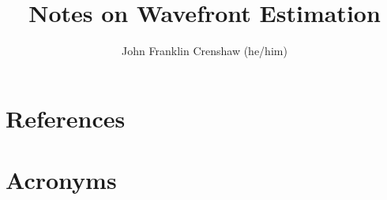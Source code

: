 \documentclass[SE,authoryear,toc]{lsstdoc}
\title{Notes on Wavefront Estimation}
\author{%
John Franklin Crenshaw (he/him)
}
\date{\vcsDate}
\begin{document}
\maketitle


\appendix
\section{References} \label{sec:bib}
\renewcommand{\refname}{} %


\section{Acronyms} \label{sec:acronyms}

\end{document}

